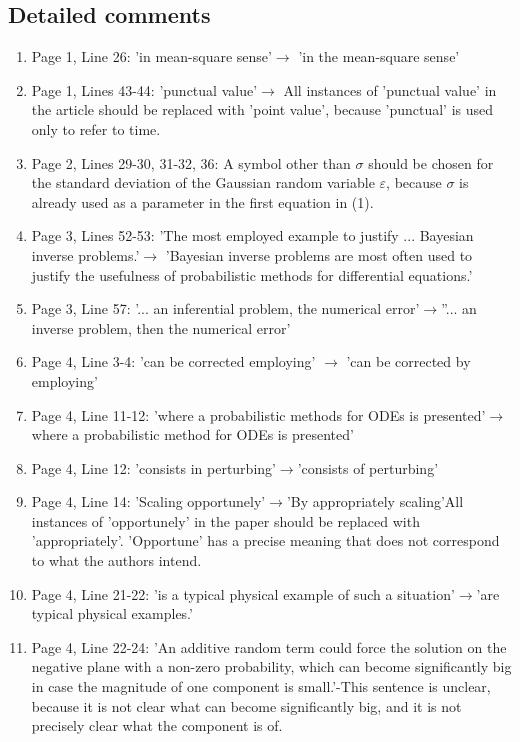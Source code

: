\documentclass{article}
\begin{document}
	\subsection*{Detailed comments}
	
	\begin{enumerate}[label=(\arabic*)]
		\item Page 1, Line 26: 'in mean-square sense'$\to$ 'in the mean-square sense'
		\item Page 1, Lines 43-44: 'punctual value'$\to$ All instances of 'punctual value' in the article should be replaced with 'point value', because 'punctual' is used only to refer to time.
		\item Page 2, Lines 29-30, 31-32, 36: A symbol other than $\sigma$ should be chosen for the standard deviation of the Gaussian random variable $\varepsilon$, because $\sigma$ is already used as a parameter in the first equation in (1). 
		\item Page 3, Lines 52-53: 'The most employed example to justify ... Bayesian inverse problems.'$\to$ 'Bayesian inverse problems are most often used to justify the usefulness of probabilistic methods for differential equations.'
		\item Page 3, Line 57: '... an inferential problem, the numerical error'$\to$''... an inverse problem, then the numerical error'
		\item Page 4, Line 3-4: 'can be corrected employing' $\to$ 'can be corrected by employing'
		\item Page 4, Line 11-12: 'where a probabilistic methods for ODEs is presented'$\to$where a probabilistic method for ODEs is presented'
		\item Page 4, Line 12: 'consists in perturbing'$\to$'consists of perturbing'
		\item Page 4, Line 14: 'Scaling opportunely'$\to$'By appropriately scaling'All instances of 'opportunely' in the paper should be replaced with 'appropriately'. 'Opportune' has a precise meaning that does not correspond to what the authors intend.
		\item Page 4, Line 21-22: 'is a typical physical example of such a situation'$\to$'are typical physical examples.'
		\item Page 4, Line 22-24: 'An additive random term could force the solution on the negative plane with a non-zero probability, which can become significantly big in case the magnitude of one component is small.'-This sentence is unclear, because it is not clear what can become significantly big, and it is not precisely clear what the component is of.

\end{enumerate}
\end{document}
